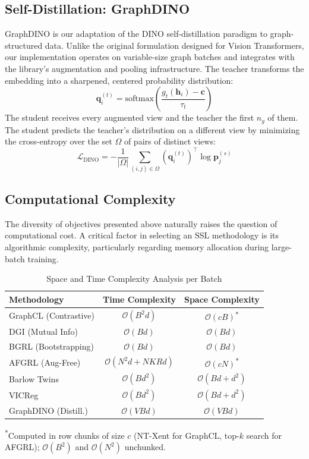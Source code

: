 \documentclass[conference]{IEEEtran}
\begin{document}
\subsection{Self-Distillation: GraphDINO}
GraphDINO is our adaptation of the DINO self-distillation paradigm \cite{dino} to graph-structured data. Unlike the original formulation designed for Vision Transformers, our implementation operates on variable-size graph batches and integrates with the library's augmentation and pooling infrastructure. The teacher transforms the embedding into a sharpened, centered probability distribution:
\begin{equation}
\bm{q}_i^{(t)} = \text{softmax}\left(\frac{g_{t}(\bm{h}_i) - \bm{c}}{\tau_{t}}\right)
\end{equation}
The student receives every augmented view and the teacher the first $n_g$ of them. The student predicts the teacher's distribution on a different view by minimizing the cross-entropy over the set $\Omega$ of pairs of distinct views:
\begin{equation}
\mathcal{L}_{\text{DINO}} = -\frac{1}{| \Omega |} \sum_{(i,j) \in \Omega} \left( \bm{q}_i^{(t)} \right)^\top \log \bm{p}_j^{(s)}
\end{equation}

\subsection{Computational Complexity}
\label{sec:complexity}
The diversity of objectives presented above naturally raises the question of computational cost. A critical factor in selecting an SSL methodology is its algorithmic complexity, particularly regarding memory allocation during large-batch training.

\begin{table}[htbp]
\centering
\caption{Space and Time Complexity Analysis per Batch}
\label{tab:complexity}
\begin{tabular}{@{}lcc@{}}
\toprule
\textbf{Methodology} & \textbf{Time Complexity} & \textbf{Space Complexity} \\ \midrule
GraphCL (Contrastive) & $\mathcal{O}(B^2 d)$ & $\mathcal{O}(cB)$\textsuperscript{*} \\
DGI (Mutual Info) & $\mathcal{O}(B d)$ & $\mathcal{O}(B d)$ \\
BGRL (Bootstrapping) & $\mathcal{O}(B d)$ & $\mathcal{O}(B d)$ \\
AFGRL (Aug-Free) & $\mathcal{O}(N^2 d + NKRd)$ & $\mathcal{O}(cN)$\textsuperscript{*} \\
Barlow Twins & $\mathcal{O}(B d^2)$ & $\mathcal{O}(B d + d^2)$ \\
VICReg & $\mathcal{O}(B d^2)$ & $\mathcal{O}(B d + d^2)$ \\
GraphDINO (Distill.) & $\mathcal{O}(V B d)$ & $\mathcal{O}(V B d)$ \\ \bottomrule
\end{tabular}

\vspace{2pt}
{\footnotesize \textsuperscript{*}Computed in row chunks of size $c$ (NT-Xent for GraphCL, top-$k$ search for AFGRL); $\mathcal{O}(B^2)$ and $\mathcal{O}(N^2)$ unchunked.}
\end{table}
\end{document}

